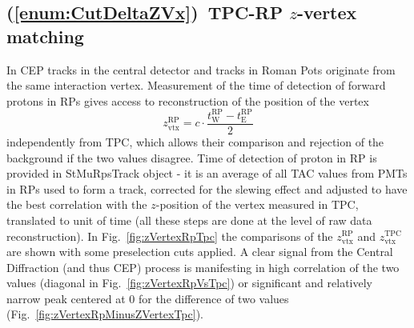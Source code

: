 \subsection{(\ref{enum:CutDeltaZVx})~TPC-RP \texorpdfstring{$z$}{z}-vertex matching}\label{sec:C5}

In CEP tracks in the central detector and tracks in Roman Pots originate from the same interaction vertex. Measurement of the time of detection of forward protons in RPs gives access to reconstruction of the position of the vertex
\begin{equation}
z_{\text{vtx}}^{\text{RP}} = c\cdot\frac{t^{\text{RP}}_{\text{W}} - t^{\text{RP}}_{\text{E}}}{2}
\end{equation}
independently from TPC, which allows their comparison and rejection of the background if the two values disagree. Time of detection of proton in RP is provided in StMuRpsTrack object - it is an average of all TAC values from PMTs in RPs used to form a track, corrected for the slewing effect and adjusted to have the best correlation with the $z$-position of the vertex measured in TPC, translated to unit of time (all these steps are done at the level of raw data reconstruction). In Fig.~\ref{fig:zVertexRpTpc} the comparisons of the $z_{\text{vtx}}^{\text{RP}}$ and $z_{\text{vtx}}^{\text{TPC}}$ are shown with some preselection cuts applied. A clear signal from the Central Diffraction (and thus CEP) process is manifesting in high correlation of the two values (diagonal in Fig.~\ref{fig:zVertexRpVsTpc}) or significant and relatively narrow peak centered at 0 for the difference of two values (Fig.~\ref{fig:zVertexRpMinusZVertexTpc}). %
